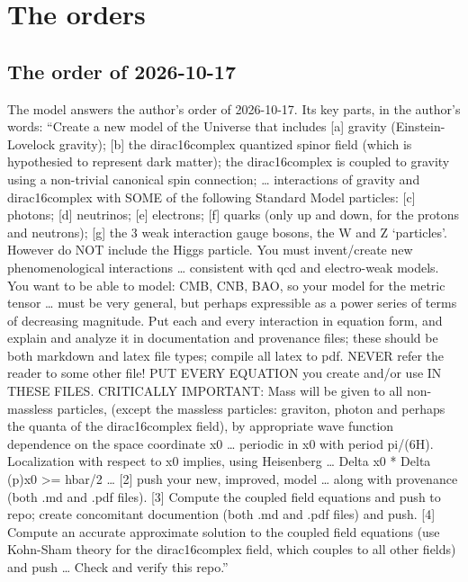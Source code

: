 \documentclass[
  10pt,
]{article}
\begin{document}
\hypertarget{the-orders}{%
\section{The orders}\label{the-orders}}

\hypertarget{the-order-of-2026-10-17}{%
\subsection{The order of 2026-10-17}\label{the-order-of-2026-10-17}}

The model answers the author's order of 2026-10-17. Its key parts, in
the author's words: ``Create a new model of the Universe that includes
{[}a{]} gravity (Einstein-Lovelock gravity); {[}b{]} the dirac16complex
quantized spinor field (which is hypothesied to represent dark matter);
the dirac16complex is coupled to gravity using a non-trivial canonical
spin connection; \ldots{} interactions of gravity and dirac16complex
with SOME of the following Standard Model particles: {[}c{]} photons;
{[}d{]} neutrinos; {[}e{]} electrons; {[}f{]} quarks (only up and down,
for the protons and neutrons); {[}g{]} the 3 weak interaction gauge
bosons, the W and Z `particles'. However do NOT include the Higgs
particle. You must invent/create new phenomenological interactions
\ldots{} consistent with qcd and electro-weak models. You want to be
able to model: CMB, CNB, BAO, so your model for the metric tensor
\ldots{} must be very general, but perhaps expressible as a power series
of terms of decreasing magnitude. Put each and every interaction in
equation form, and explain and analyze it in documentation and
provenance files; these should be both markdown and latex file types;
compile all latex to pdf. NEVER refer the reader to some other file! PUT
EVERY EQUATION you create and/or use IN THESE FILES. CRITICALLY
IMPORTANT: Mass will be given to all non-massless particles, (except the
massless particles: graviton, photon and perhaps the quanta of the
dirac16complex field), by appropriate wave function dependence on the
space coordinate x0 \ldots{} periodic in x0 with period pi/(6H).
Localization with respect to x0 implies, using Heisenberg \ldots{} Delta
x0 * Delta (p)x0 \textgreater= hbar/2 \ldots{} {[}2{]} push your new,
improved, model \ldots{} along with provenance (both .md and .pdf
files). {[}3{]} Compute the coupled field equations and push to repo;
create concomitant documention (both .md and .pdf files) and push.
{[}4{]} Compute an accurate approximate solution to the coupled field
equations (use Kohn-Sham theory for the dirac16complex field, which
couples to all other fields) and push \ldots{} Check and verify this
repo.''
\end{document}
